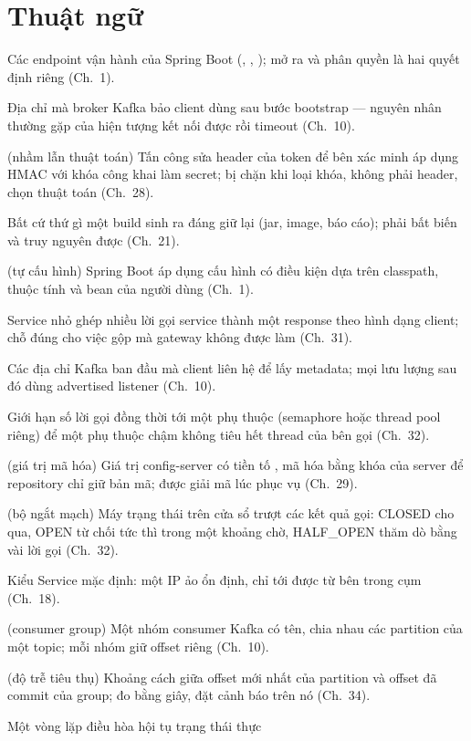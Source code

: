 \chapter{Thuật ngữ}
\label{app:glossary}

\newcommand{\gloss}[2]{\item[#1] #2}
\begin{description}\setlength{\itemsep}{2pt}
\gloss{Actuator}{Các endpoint vận hành của Spring Boot
  (\code{/actuator/health}, \code{/metrics}, \code{/prometheus}); mở ra
  và phân quyền là hai quyết định riêng (Ch.~1).}
\gloss{Advertised listener}{Địa chỉ mà broker Kafka bảo client dùng
  sau bước bootstrap --- nguyên nhân thường gặp của hiện tượng kết nối
  được rồi timeout (Ch.~10).}
\gloss{Algorithm confusion}{(nhầm lẫn thuật toán) Tấn công sửa header
  \code{alg} của token để bên xác minh áp dụng HMAC với khóa công khai
  làm secret; bị chặn khi loại khóa, không phải header, chọn thuật toán
  (Ch.~28).}
\gloss{Artifact}{Bất cứ thứ gì một build sinh ra đáng giữ lại (jar,
  image, báo cáo); phải bất biến và truy nguyên được (Ch.~21).}
\gloss{Auto-configuration}{(tự cấu hình) Spring Boot áp dụng cấu hình
  có điều kiện dựa trên classpath, thuộc tính và bean của người dùng
  (Ch.~1).}
\gloss{Backend for frontend}{Service nhỏ ghép nhiều lời gọi service
  thành một response theo hình dạng client; chỗ đúng cho việc gộp mà
  gateway không được làm (Ch.~31).}
\gloss{Bootstrap servers}{Các địa chỉ Kafka ban đầu mà client liên hệ
  để lấy metadata; mọi lưu lượng sau đó dùng advertised listener
  (Ch.~10).}
\gloss{Bulkhead}{Giới hạn số lời gọi đồng thời tới một phụ thuộc
  (semaphore hoặc thread pool riêng) để một phụ thuộc chậm không tiêu
  hết thread của bên gọi (Ch.~32).}
\gloss{Cipher value}{(giá trị mã hóa) Giá trị config-server có tiền tố
  \code{\{cipher\}}, mã hóa bằng khóa của server để repository chỉ giữ
  bản mã; được giải mã lúc phục vụ (Ch.~29).}
\gloss{Circuit breaker}{(bộ ngắt mạch) Máy trạng thái trên cửa sổ trượt
  các kết quả gọi: CLOSED cho qua, OPEN từ chối tức thì trong một
  khoảng chờ, HALF\_OPEN thăm dò bằng vài lời gọi (Ch.~32).}
\gloss{ClusterIP}{Kiểu Service mặc định: một IP ảo ổn định, chỉ tới
  được từ bên trong cụm (Ch.~18).}
\gloss{Consumer group}{(consumer group) Một nhóm consumer Kafka có tên,
  chia nhau các partition của một topic; mỗi nhóm giữ offset riêng
  (Ch.~10).}
\gloss{Consumer lag}{(độ trễ tiêu thụ) Khoảng cách giữa offset mới nhất
  của partition và offset đã commit của group; đo bằng giây, đặt cảnh
  báo trên nó (Ch.~34).}
\gloss{Controller (k8s)}{Một vòng lặp điều hòa hội tụ trạng thái thực
}
\end{description}

